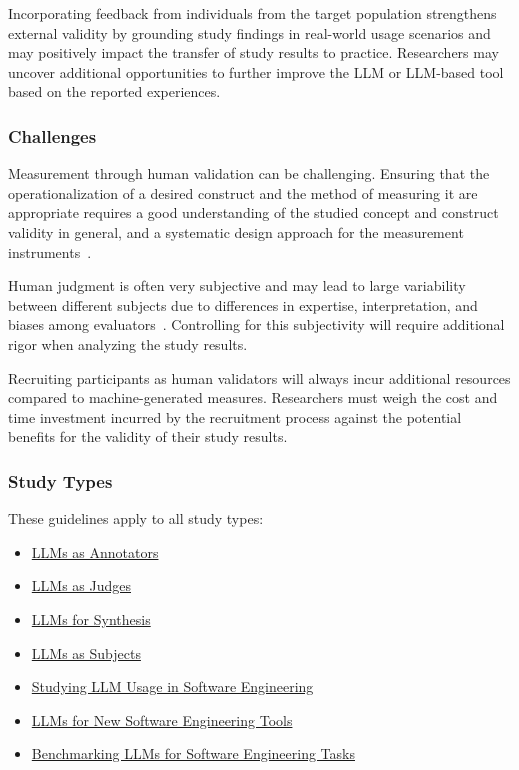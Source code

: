 Incorporating feedback from individuals from the target population strengthens external validity by grounding study findings in real-world usage scenarios and may positively impact the transfer of study results to practice.
Researchers may uncover additional opportunities to further improve the LLM or LLM-based tool based on the reported experiences.

\subsubsection{Challenges}

Measurement through human validation can be challenging.
Ensuring that the operationalization of a desired construct and the method of measuring it are appropriate requires a good understanding of the studied concept and construct validity in general, and a systematic design approach for the measurement instruments~\cite{}.

Human judgment is often very subjective and may lead to large variability between different subjects due to differences in expertise, interpretation, and biases among evaluators~\cite{DBLP:journals/pacmhci/McDonaldSF19}.
Controlling for this subjectivity will require additional rigor when analyzing the study results.

Recruiting participants as human validators will always incur additional resources compared to machine-generated measures.
Researchers must weigh the cost and time investment incurred by the recruitment process against the potential benefits for the validity of their study results.

\subsubsection{Study Types}

These guidelines apply to all study types:

\begin{itemize}
    \item \href{/study-types/#llms-as-annotators}{LLMs as Annotators}
    \item \href{/study-types/#llms-as-judges}{LLMs as Judges}
    \item \href{/study-types/#llms-for-synthesis}{LLMs for Synthesis}
    \item \href{/study-types/#llms-as-subjects}{LLMs as Subjects}
    \item \href{/study-types/#studying-llm-usage-in-software-engineering}{Studying LLM Usage in Software Engineering}
    \item \href{/study-types/#llms-for-new-software-engineering-tools}{LLMs for New Software Engineering Tools}
    \item \href{/study-types/#benchmarking-llms-for-software-engineering-tasks}{Benchmarking LLMs for Software Engineering Tasks}
\end{itemize}

